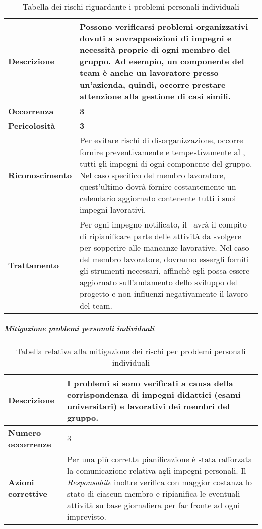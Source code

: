 \begin{table}[H]
	\begin{center}
		\begin{tabular}{|l | p{11cm}|}
			\hline
			\textbf{Descrizione}	& Possono verificarsi problemi organizzativi dovuti a sovrapposizioni di impegni e necessità proprie di ogni membro del gruppo. Ad esempio, un componente del team è anche un lavoratore presso un'azienda, quindi, occorre prestare attenzione alla gestione di casi simili. \\
			\hline
			\textbf{Occorrenza}	&	\textbf{3}	\\
			\hline
			\textbf{Pericolosità}	&	\textbf{3}	\\
			\hline
			\textbf{Riconoscimento}	&	Per evitare rischi di disorganizzazione, occorre fornire preventivamente e tempestivamente al \textit{\RdP}, tutti gli impegni di ogni componente del gruppo. Nel caso specifico del membro lavoratore, quest'ultimo dovrà fornire costantemente un calendario aggiornato contenente tutti i suoi impegni lavorativi.	\\
			\hline
			\textbf{Trattamento}	&	Per ogni impegno notificato, il \textit{\RdP}\ avrà il compito di ripianificare parte delle attività da svolgere per sopperire alle mancanze lavorative. Nel caso del membro lavoratore, dovranno essergli forniti gli strumenti necessari, affinchè egli possa essere aggiornato sull'andamento dello sviluppo del progetto e non influenzi negativamente il lavoro del team.	\\
			\hline
		\end{tabular}
		\caption{Tabella dei rischi riguardante i problemi personali individuali}
	\end{center}
\end{table}

\subparagraph{Mitigazione problemi personali individuali}

\begin{table}[H]
	\begin{center}
		\begin{tabular}{|l | p{11cm}|}
			\hline
			\textbf{Descrizione}	& I problemi si sono verificati a causa della corrispondenza di impegni didattici
			(esami universitari) e lavorativi dei membri del gruppo. \\
			\hline
			\textbf{Numero occorrenze} & 3 \\
			\hline
			\textbf{Azioni correttive}	&	Per una più corretta pianificazione è stata rafforzata la comunicazione
			relativa agli impegni personali. Il \textit{Responsabile} inoltre verifica con maggior costanza lo
			stato di ciascun membro e ripianifica le eventuali attività su base giornaliera per far fronte
			ad ogni imprevisto.	\\
			\hline
		\end{tabular}
		\caption{Tabella relativa alla mitigazione dei rischi per problemi personali individuali}
	\end{center}
\end{table}

